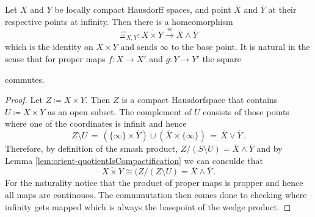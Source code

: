 \begin{lemma}\label{lem:orient-compactificationOfProduct}
	Let $X$ and $Y$ be locally compact Hausdorff spaces, and point $\overline{X}$ and
	$\overline{Y}$ at their respective points at infinity. Then there is a
	homeomorphism
	\begin{equation*}
		\Xi_{X,Y}:\overline{X\times Y}\xrightarrow{\ \cong\ } \overline{X}\wedge \overline{Y}
	\end{equation*}
	which is the identity on $X\times Y$ and sends $\infty$ to the base point.
	It is natural in the sense that for proper maps $f:X\to X'$ and $g:Y\to Y'$ the
	square
	\begin{center}
	\end{center}
	commutes.
\end{lemma}
\begin{proof}
    Let $Z\coloneq \overline{X}\times \overline{Y}$. Then $Z$ is a compact Hausdorfspace that contains $U\coloneq X\times Y$ as an open subset. The complement of $U$ consists of those points where one of the coordinates is infinit and hence
    \begin{equation*}
        Z\setminus U\,=\,(\{\infty\}\times \overline{Y})\cup (\overline{X}\times \{\infty\})\,=\, \overline{X}\vee \overline{Y}\,.
    \end{equation*}Therefore, by definition of the smash product, $ Z\big/(S\setminus U)=\overline{X}\wedge \overline{Y}$ and by Lemma \ref{lem:orient-quotientIsCompactification} we can conculde that 
    \begin{equation*}
        \overline{X\times Y} \cong (Z\big/ (Z\setminus U)=\overline{X}\wedge \overline{Y}\,.
    \end{equation*}
    For the naturality notice that the product of proper maps is propper and hence all maps are continouos. The commmutation then comes done to checking where infinity gets mapped which is always the basepoint of the wedge product.
\end{proof}
